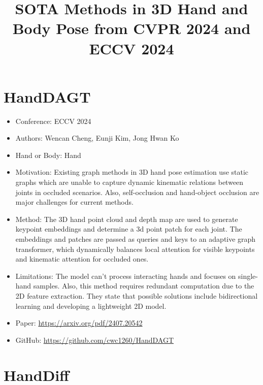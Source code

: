 \documentclass{article}
\title{SOTA Methods in 3D Hand and Body Pose from CVPR 2024 and ECCV 2024}
\author{}
\date{}
\begin{document}
\maketitle

\section*{HandDAGT}

\begin{itemize}
    \item Conference: ECCV 2024
    \item Authors: Wencan Cheng, Eunji Kim, Jong Hwan Ko
    \item Hand or Body: Hand
    \item Motivation: Existing graph methods in 3D hand pose estimation use static graphs which are unable to capture dynamic kinematic relations between joints in occluded scenarios. Also, self-occlusion and hand-object occlusion are major challenges for current methods.
    \item Method: The 3D hand point cloud and depth map are used to generate keypoint embeddings and determine a 3d point patch for each joint. The embeddings and patches are passed as queries and keys to an adaptive graph transformer, which dynamically balances local attention for visible keypoints and kinematic attention for occluded ones.
    \item Limitations: The model can't process interacting hands and focuses on single-hand samples. Also, this method requires redundant computation due to the 2D feature extraction. They state that possible solutions include bidirectional learning and developing a lightweight 2D model.
    \item Paper: \url{https://arxiv.org/pdf/2407.20542}
    \item GitHub: \url{https://github.com/cwc1260/HandDAGT}
\end{itemize}

\section*{HandDiff}
\end{document}
